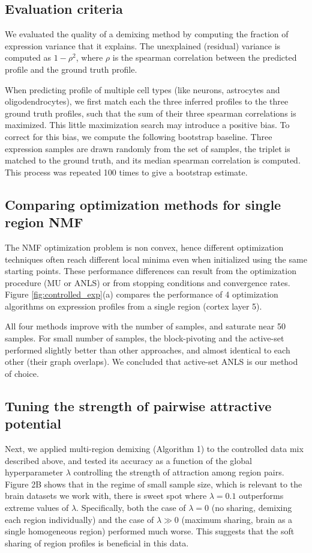 \documentclass{article} %
\begin{document}
\subsection{Evaluation criteria}
\vspace{-5pt}
We evaluated the quality of a demixing method by computing the fraction of expression variance that it explains. The unexplained (residual) variance is computed as $1-\rho^2$, where $\rho$ is the spearman correlation between the predicted profile and the ground truth profile.

When predicting profile of multiple cell types (like neurons, astrocytes and oligodendrocytes), we first match each the three inferred profiles to the three ground truth profiles, such that the sum of their three spearman correlations is maximized. This little maximization search may introduce a positive bias. To correct for this bias, we compute the following bootstrap baseline. Three expression samples are drawn randomly from the set of samples, the triplet is matched to the ground truth, and its median spearman correlation is computed. This process was repeated 100 times to give a bootstrap estimate. 

\subsection{Comparing optimization methods for single region NMF}
\vspace{-5pt}
The NMF optimization problem is non convex, hence different optimization techniques often reach different local minima even when initialized using the same starting points. These performance differences can result from the optimization procedure (MU or ANLS) or from stopping conditions and convergence rates. Figure \ref{fig:controlled_exp}(a) compares the performance of 4 optimization algorithms on expression profiles from a single region (cortex layer 5). 

All four methods improve with the number of samples, and saturate near 50 samples. For small number of samples, the block-pivoting and the active-set performed slightly better than other approaches, and almost identical to each other (their graph overlaps). We concluded that active-set ANLS is our method of choice.

\subsection{Tuning the strength of pairwise attractive potential}
\vspace{-10pt}
Next, we applied multi-region demixing (Algorithm 1) to the controlled data mix described above, and tested its accuracy as a function of the global hyperparameter $\lambda$ controlling the strength of attraction among region pairs. Figure 2B shows that in the regime of small sample size, which is relevant to the brain datasets we work with, there is sweet spot where $\lambda=0.1$ outperforms extreme values of $\lambda$. Specifically, both the case of $\lambda=0$ (no sharing, demixing each region individually) and the case of $\lambda \gg0$ (maximum sharing, brain as a single homogeneous region) performed much worse. This suggests that the soft sharing of region profiles is beneficial in this data.  
\end{document}

